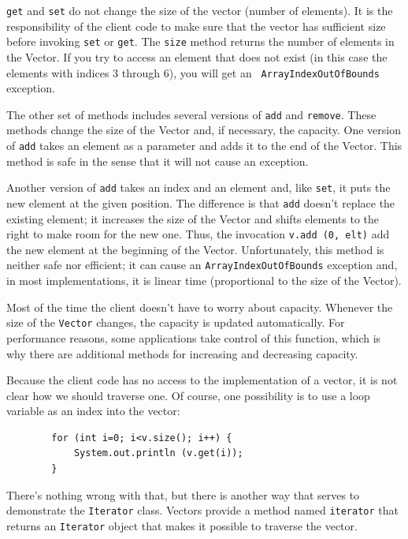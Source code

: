 \documentclass[12pt]{book}
\theoremstyle{exercise}
\begin{document}
{\tt get} and {\tt set} do not change the size of the vector (number
of elements).  It is the responsibility of the client code to make
sure that the vector has sufficient size before invoking {\tt set} or
{\tt get}.  The {\tt size} method returns the number of elements in
the Vector.  If you try to access an element that does not exist (in
this case the elements with indices 3 through 6), you will get an {\tt
ArrayIndexOutOfBounds} exception.


The other set of methods includes several versions
of {\tt add} and {\tt remove}.  These methods change the size
of the Vector and, if necessary, the capacity.  One version
of {\tt add} takes an element as a parameter and adds it to the
end of the Vector.  This method is safe in the sense that it
will not cause an exception.

Another version of {\tt add}
takes an index and an element and, like {\tt set}, it puts
the new element at the given position.  The difference is
that {\tt add} doesn't replace the existing element; it
increases the size of the Vector and shifts elements to the
right to make room for the new one.  Thus, the invocation
{\tt v.add (0, elt)} add the new element at the beginning
of the Vector.  Unfortunately, this method is neither
safe nor efficient; it can cause an {\tt ArrayIndexOutOfBounds}
exception and, in most implementations, it is linear time
(proportional to the size of the Vector).

Most of the time the client doesn't have to worry about
capacity.  Whenever the size of the {\tt Vector} changes,
the capacity is updated automatically.
For performance reasons, some applications take
control of this function, which is why there are additional methods
for increasing and decreasing capacity.

Because the client code has no access to the implementation of
a vector, it is not clear how we should traverse one.  Of course,
one possibility is to use a loop variable as an index into the
vector:

\begin{verbatim}
        for (int i=0; i<v.size(); i++) {
            System.out.println (v.get(i));
        }
\end{verbatim}
%
There's nothing wrong with that, but there is another way that
serves to demonstrate the {\tt Iterator} class.  Vectors provide
a method named {\tt iterator} that returns an {\tt Iterator} object
that makes it possible to traverse the vector.
\end{document}
